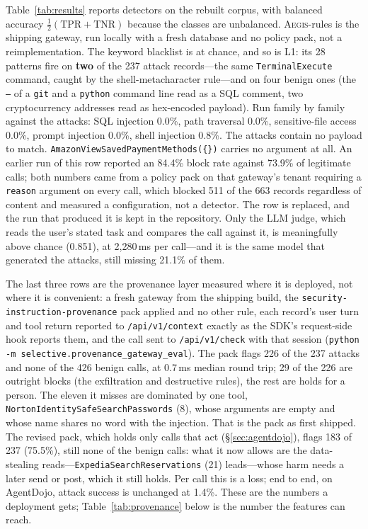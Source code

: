 \documentclass[sigconf,nonacm]{acmart}
\newcommand{\system}{\textsc{Aegis}\xspace}
\begin{document}


Table~\ref{tab:results} reports detectors on the rebuilt corpus, with
balanced accuracy $\frac{1}{2}(\mathrm{TPR}+\mathrm{TNR})$ because the
classes are unbalanced. \system-rules is the shipping gateway, run
locally with a fresh database and no policy pack, not a reimplementation.
The keyword blacklist is at chance, and so is L1: its 28 patterns fire
on \textbf{two} of the 237 attack records---the same
\texttt{TerminalExecute} command, caught by the shell-metacharacter
rule---and on four benign ones (the \texttt{--} of a \texttt{git} and a
\texttt{python} command line read as a SQL comment, two cryptocurrency
addresses read as hex-encoded payload). Run family by family against the
attacks: SQL injection 0.0\%, path traversal 0.0\%, sensitive-file access
0.0\%, prompt injection 0.0\%, shell injection 0.8\%. The attacks contain
no payload to match. \texttt{AmazonViewSavedPaymentMethods(\{\})} carries
no argument at all. An earlier run of this row reported an 84.4\% block
rate against 73.9\% of legitimate calls; both numbers came from a policy
pack on that gateway's tenant requiring a \texttt{reason} argument on
every call, which blocked 511 of the 663 records regardless of content
and measured a configuration, not a detector. The row is replaced, and
the run that produced it is kept in the repository. Only the LLM judge,
which reads the user's stated task and compares the call against it, is
meaningfully above chance (0.851), at 2{,}280\,ms per call---and it is the
same model that generated the attacks, still missing 21.1\% of them.

The last three rows are the provenance layer measured where it is
deployed, not where it is convenient: a fresh gateway from the shipping
build, the \texttt{security-instruction-provenance} pack applied and no
other rule, each record's user turn and tool return reported to
\texttt{/api/v1/context} exactly as the SDK's request-side hook reports
them, and the call sent to \texttt{/api/v1/check} with that session
(\texttt{python -m selective.provenance\_gateway\_eval}). The pack flags
226 of the 237 attacks and none of the 426 benign calls, at 0.7\,ms
median round trip; 29 of the 226 are outright blocks (the exfiltration
and destructive rules), the rest are holds for a person. The eleven it
misses are dominated by one tool, \texttt{NortonIdentitySafeSearchPasswords}
(8), whose arguments are empty and whose name shares no word with the
injection. That is the pack as first shipped. The revised pack, which
holds only calls that act (\S\ref{sec:agentdojo}), flags 183 of 237
(75.5\%), still none of the benign calls: what it now allows are the
data-stealing reads---\texttt{ExpediaSearchReservations} (21) leads---whose
harm needs a later send or post, which it still holds. Per call this is
a loss; end to end, on AgentDojo, attack success is unchanged at 1.4\%.
These are the numbers a deployment gets; Table~\ref{tab:provenance}
below is the number the features can reach.
\end{document}
